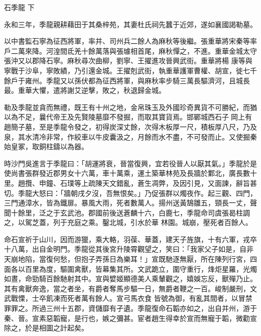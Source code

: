 
\begin{pinyinscope}

 石季龍
 下



 永和三年，季龍親耕藉田于其桑梓苑，其妻杜氏祠先蠶于近郊，遂如襄國謁勒墓。



 以中書監石寧為征西將軍，率并、司州兵二餘人為麻秋等後繼。張重華將宋秦等率戶二萬來降。河湟間氐羌十餘萬落與張璩相首尾，麻秋憚之，不進。重華金城太守張沖又以郡降石寧。麻秋尋次曲柳，劉寧、王擢進攻晉興武街。重華將楊
 康等與寧戰于沙阜，寧敗績，乃引還金城。王擢剋武街，執重華護軍曹權、胡宣，徙七千餘戶于雍州。季龍又以孫伏都為征西將軍，與麻秋率步騎三萬長驅濟河，且城長最。重華大懼，遣將謝艾逆擊，敗之，秋退歸金城。



 勒及季龍並貪而無禮，既王有十州之地，金帛珠玉及外國珍奇異貨不可勝紀，而猶以為不足，曩代帝王及先賢陵墓靡不發掘，而取其寶貨焉。邯鄲城西石子岡上有趙簡子墓，至是季龍令發之，初得炭深丈餘，次得木板厚一尺，積板厚八尺，乃及泉，其水清冷非常，作絞車以牛皮囊汲之，月餘而水不盡，不可發而止。又使掘秦
 始皇冢，取銅柱鑄以為器。



 時沙門吳進言于季龍曰：「胡運將衰，晉當復興，宜若役晉人以厭其氣。」季龍於是使尚書張群發近郡男女十六萬，車十萬乘，運土築華林苑及長牆於鄴北，廣長數十里。趙攬、申鐘、石璞等上疏陳天文錯亂，蒼生凋弊，及因引見，又面諫，辭旨甚切。季龍大怒曰：「牆朝戌夕沒，吾無恨矣。」乃促張群以燭夜作。起三觀、四門，三門通漳水，皆為鐵扉。暴風大雨，死者數萬人。揚州送黃鵠雛五，頸長一丈，聲聞十餘里，泛之于玄武池。郡國前後送蒼麟十六，白鹿七，季龍命司虞張曷柱調之，以駕芝蓋，列于充庭之乘。鑿北城，引水於華
 林園。城崩，壓死者百餘人。



 命石宣祈于山川，因而游獵，乘大輅，羽葆、華蓋，建天子旌旗，十有六軍，戎卒十八萬，出自金明門。季龍從其後宮升陵霄觀望之，笑曰：「我家父子如是，自非天崩地陷，當復何愁，但抱子弄孫日為樂耳！」宣既馳逐無厭，所在陳列行宮，四面各以百里為度，驅圍禽獸，皆幕集其所。文武跪立，圍守重行，烽炬星羅，光燭如晝，命勁騎百餘馳射其中。宣與嬖姬顯德美人乘輦觀之，嬉娛忘反，獸殫乃止。其有禽獸奔逸，當之者坐，有爵者奪馬步驅一日，無爵者鞭之一百。峻制嚴刑，文武戰慄，士卒飢凍而死者萬有餘人。宣弓馬衣食
 皆號為御，有亂其間者，以冒禁罪罪之。所過三州十五郡，資儲靡有孑遺。季龍復命石韜亦如之，出自并州，游于秦、晉。宣素惡韜寵，是行也，嫉之彌甚。宦者趙生得幸於宣而無寵于韜，微勸宣除之，於是相圖之計起矣。




\end{pinyinscope}
